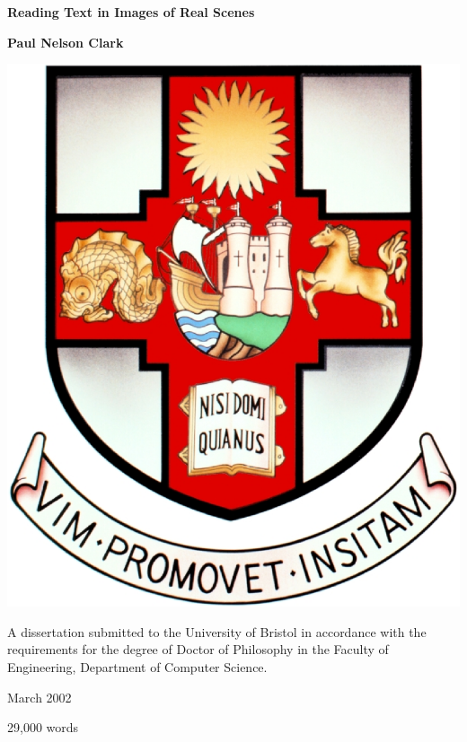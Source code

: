 \documentclass[11pt,a4paper]{report}
\begin{document}
\pagestyle{empty}


\begin{center}
\LARGE{\bf Reading Text in Images of Real Scenes}
\end{center}
\vspace{0.5in}
\begin{center}
\large{\bf Paul Nelson Clark}
\end{center}
\vspace{0.5in}
\begin{center}
\includegraphics[scale=0.2]{ubcrest-jpegps2.eps}
\end{center}
\vspace{0.5in}
\begin{center}
A dissertation submitted to the University of Bristol in accordance with the
requirements for the degree of Doctor of Philosophy in the Faculty of
Engineering, Department of Computer Science.
\end{center}
\vspace{0.18in}
\begin{center}
March 2002
\end{center}
\vspace{1.0in} \hfill 29,000 words \quad \quad
\end{document}
